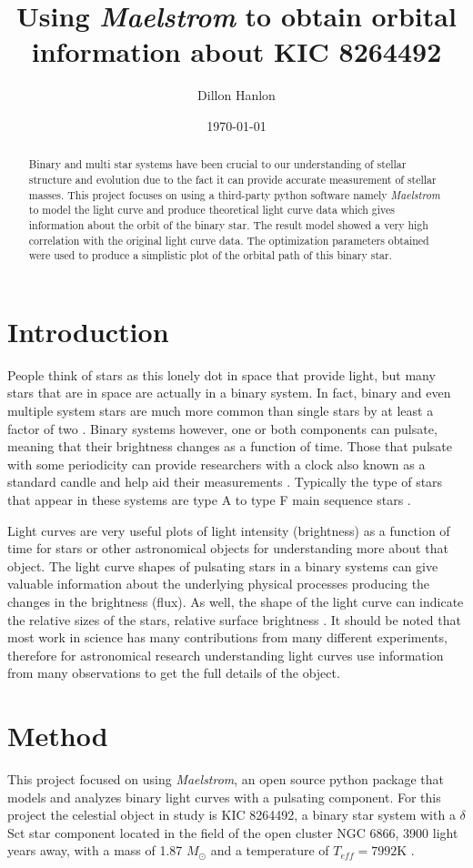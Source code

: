 \documentclass[]{article}
\title{Using \textit{Maelstrom} to obtain orbital information about KIC 8264492 }
\author{Dillon Hanlon}
\date{\today}
\begin{document}
\maketitle
\begin{abstract}
    Binary and multi star systems have been crucial to our understanding of stellar structure and evolution due to the fact it can provide accurate measurement of stellar masses. This project focuses on using a third-party python software namely \textit{Maelstrom} to model the light curve and produce theoretical light curve data which gives information about the orbit of the binary star. The result model showed a very high correlation with the original light curve data. The optimization parameters obtained were used to produce a simplistic plot of the orbital path of this binary star. 
\end{abstract}
\section{Introduction}
People think of stars as this lonely dot in space that provide light, but many stars that are in space are actually in a binary system.
In fact, binary and even multiple system stars are much more common than single stars by at least a factor of two \cite{guszejnov2017protostellar}.
Binary systems however, one or both components can pulsate, meaning that their brightness changes as a function of time. 
Those that pulsate with some periodicity can provide researchers with a clock also known as a standard candle and help aid their measurements  \cite{murphy2018finding}. 
Typically the type of stars that appear in these systems are type A to type F main sequence stars \cite{garg2010high}.

Light curves are very useful plots of light intensity (brightness) as a function of time for stars or other astronomical objects for understanding more about that object. 
The light curve shapes of pulsating stars in a binary systems can give valuable information about the underlying physical processes producing the changes in the brightness (flux). 
As well, the shape of the light curve can indicate the relative sizes of the stars, relative surface brightness \cite{russell1912determination}. 
It should be noted that most work in science has many contributions from many different experiments, therefore for astronomical research understanding light curves use information from many observations to get the full details of the object.

\section{Method}
This project focused on using \textit{Maelstrom}, an open source python package that models and analyzes binary light curves with a pulsating component. 
For this project the celestial object in study is KIC 8264492, a binary star system with a $\delta$ Sct star component located in the field of the open cluster NGC 6866, 3900 light years away, with a mass of 1.87 $M_{\odot}$ and a temperature of $T_{eff} = 7992$K \cite{balona2013pulsation,shibahashi2015fm}.
\end{document}
